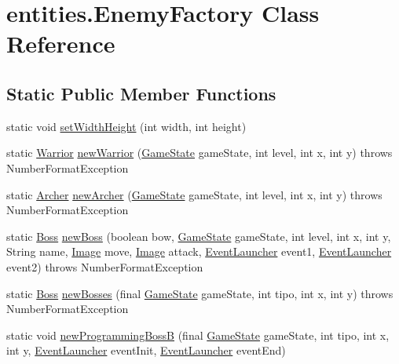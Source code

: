 \hypertarget{classentities_1_1_enemy_factory}{}\section{entities.\+Enemy\+Factory Class Reference}
\label{classentities_1_1_enemy_factory}
\subsection*{Static Public Member Functions}
\begin{DoxyCompactItemize}
\item 
static void \mbox{\hyperlink{classentities_1_1_enemy_factory_ac365b8af00c2c3ee17d5fc4b4f0493b5}{set\+Width\+Height}} (int width, int height)
\item 
static \mbox{\hyperlink{classentities_1_1_warrior}{Warrior}} \mbox{\hyperlink{classentities_1_1_enemy_factory_ad72ed81380d9690750ce9abf6046684c}{new\+Warrior}} (\mbox{\hyperlink{classstates_1_1_game_state}{Game\+State}} game\+State, int level, int x, int y)  throws Number\+Format\+Exception 
\item 
static \mbox{\hyperlink{classentities_1_1_archer}{Archer}} \mbox{\hyperlink{classentities_1_1_enemy_factory_a946eb73b35bcc70cc0a9a579f9d25b79}{new\+Archer}} (\mbox{\hyperlink{classstates_1_1_game_state}{Game\+State}} game\+State, int level, int x, int y)  throws Number\+Format\+Exception 
\item 
static \mbox{\hyperlink{classentities_1_1_boss}{Boss}} \mbox{\hyperlink{classentities_1_1_enemy_factory_a0f1199be59b5f19063d3546aa1a26b51}{new\+Boss}} (boolean bow, \mbox{\hyperlink{classstates_1_1_game_state}{Game\+State}} game\+State, int level, int x, int y, String name, \mbox{\hyperlink{classorg_1_1newdawn_1_1slick_1_1_image}{Image}} move, \mbox{\hyperlink{classorg_1_1newdawn_1_1slick_1_1_image}{Image}} attack, \mbox{\hyperlink{interfaceentities_1_1_event_launcher}{Event\+Launcher}} event1, \mbox{\hyperlink{interfaceentities_1_1_event_launcher}{Event\+Launcher}} event2)  throws Number\+Format\+Exception 
\item 
static \mbox{\hyperlink{classentities_1_1_boss}{Boss}} \mbox{\hyperlink{classentities_1_1_enemy_factory_a49f6ba447fc11bc377d2dcc5812747ce}{new\+Bosses}} (final \mbox{\hyperlink{classstates_1_1_game_state}{Game\+State}} game\+State, int tipo, int x, int y)  throws Number\+Format\+Exception 
\item 
static void \mbox{\hyperlink{classentities_1_1_enemy_factory_a6f35aad14a67ec068f8a2c555a26a7ee}{new\+Programming\+BossB}} (final \mbox{\hyperlink{classstates_1_1_game_state}{Game\+State}} game\+State, int tipo, int x, int y, \mbox{\hyperlink{interfaceentities_1_1_event_launcher}{Event\+Launcher}} event\+Init, \mbox{\hyperlink{interfaceentities_1_1_event_launcher}{Event\+Launcher}} event\+End)

\end{DoxyCompactItemize}
